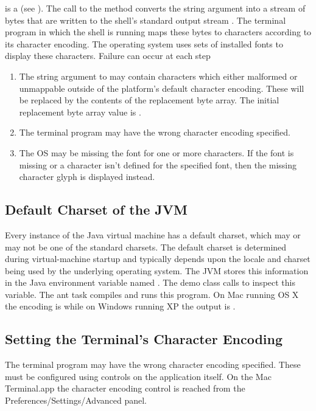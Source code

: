  is a  (see ).
The call to the  method converts the string argument into 
a stream of bytes that are written to the shell's standard output stream .
The terminal program in which the shell is running maps 
these bytes to characters according to its character encoding.
The operating system uses sets of installed fonts to display these characters.
Failure can occur at each step
\begin{enumerate}
\item The string argument to  may contain characters which 
either malformed or unmappable outside of the platform's default character encoding.
These will be replaced by the contents of the replacement byte array.
The initial replacement byte array value is .
\item The terminal program may have the wrong character encoding specified.
\item The OS may be missing the font for one or more characters.
If the font is missing or a character isn't defined for the specified font,
then the missing character glyph is displayed instead.
\end{enumerate}

\subsection{Default Charset of the JVM}

Every instance of the Java virtual machine has a default charset,
which may or may not be one of the standard charsets. The default
charset is determined during virtual-machine startup and typically
depends upon the locale and charset being used by the underlying
operating system.
The JVM stores this information in the Java environment variable named .
The demo class  
calls  to inspect this variable.
%
%
The ant task  compiles and runs this program.
On Mac running OS X the encoding is 
while on Windows running XP the output is .

\subsection{Setting the Terminal's Character Encoding}

The terminal program may have the wrong character encoding specified.
These must be configured using controls on the application itself.
On the Mac Terminal.app the character encoding control is reached from the
Preferences/Settings/Advanced panel.



